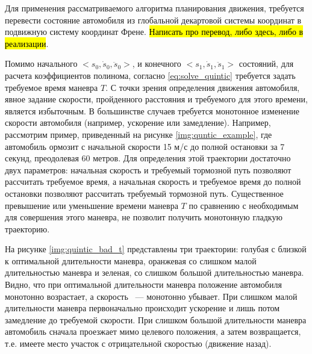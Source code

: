 Для применения рассматриваемого алгоритма планирования движения, требуется перевести состояние автомобиля из
глобальной декартовой системы координат в подвижную систему координат Френе. \hl{Написать про перевод, либо здесь,
либо в реализации}.

Помимо начального $<s_0, \dot{s}_0, \ddot{s}_0>$, и конечного $<s_1, \dot{s}_1, \ddot{s}_1>$ состояний, для расчета
коэффициентов полинома, согласно \ref{eq:solve_quintic} требуется задать требуемое время маневра $T$. С точки зрения
определения движения автомобиля, явное задание скорости, пройденного расстояния и требуемого для этого времени, является
избыточным. В большинстве случаев требуется монотонное изменение скорости автомобиля (например, ускорение или
замедление). Например, рассмотрим пример, приведенный на рисунке \ref{img:quntic_example}, где автомобиль
ормозит с начальной скорости 15 м/с до полной остановки за 7 секунд, преодолевая 60 метров. Для определения этой траектории
достаточно двух параметров: начальная скорость и требуемый тормозной путь позволяют рассчитать требуемое время, а
начальная скорость и требуемое время до полной остановки позволяют рассчитать требуемый тормозной путь. Существенное
превышение или уменьшение времени маневра $T$ по сравнению с необходимым для совершения этого маневра, не позволит
получить монотонную гладкую траекторию.

На рисунке \ref{img:quintic_bad_t} представлены три траектории:
голубая с близкой к оптимальной длительности маневра, оранжевая со слишком малой длительностью маневра и зеленая, со
слишком большой длительностью маневра. Видно, что при оптимальной длительности маневра положение автомобиля монотонно
возрастает, а скорость ~--- монотонно убывает. При слишком малой длительности маневра первоначально происходит
ускорение и лишь потом замедление до требуемой скорости. При слишком большой длительности маневра автомобиль сначала
проезжает мимо целевого положения, а затем возвращается, т.е. имеете место участок с отрицательной скоростью
(движение назад).

